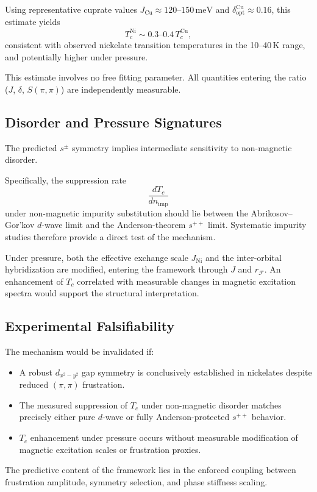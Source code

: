     Using representative cuprate values
    $J_{\mathrm{Cu}}\approx120\text{--}150\,\mathrm{meV}$
    and $\delta_{\mathrm{opt}}^{\mathrm{Cu}}\approx0.16$,
    this estimate yields
    \begin{equation}
      T_c^{\mathrm{Ni}}
      \sim
      0.3\text{--}0.4 \,
      T_c^{\mathrm{Cu}},
    \end{equation}
    consistent with observed nickelate
    transition temperatures in the 10--40\,K range,
    and potentially higher under pressure.

    This estimate involves no free fitting parameter.
    All quantities entering the ratio
    ($J$, $\delta$, $S(\pi,\pi)$)
    are independently measurable.

  \subsection{Disorder and Pressure Signatures}
    \label{subsec:nickelates-signatures}

    The predicted $s^\pm$ symmetry
    implies intermediate sensitivity
    to non-magnetic disorder.

    Specifically,
    the suppression rate
    \begin{equation}
      \frac{dT_c}{dn_{\mathrm{imp}}}
    \end{equation}
    under non-magnetic impurity substitution
    should lie between
    the Abrikosov--Gor'kov $d$-wave limit
    and the Anderson-theorem $s^{++}$ limit.
    Systematic impurity studies therefore
    provide a direct test of the mechanism.

    Under pressure,
    both the effective exchange scale $J_{\mathrm{Ni}}$
    and the inter-orbital hybridization
    are modified,
    entering the framework
    through $J$ and $r_{\mathcal F}$.
    An enhancement of $T_c$
    correlated with measurable changes
    in magnetic excitation spectra
    would support the structural interpretation.

  \subsection{Experimental Falsifiability}
    \label{subsec:nickelates-falsifiability}

    The mechanism would be invalidated if:

    \begin{itemize}
      \item
      A robust $d_{x^2-y^2}$ gap symmetry
      is conclusively established in nickelates
      despite reduced $(\pi,\pi)$ frustration.

      \item
      The measured suppression of $T_c$
      under non-magnetic disorder
      matches precisely either
      pure $d$-wave
      or fully Anderson-protected $s^{++}$ behavior.

      \item
      $T_c$ enhancement under pressure
      occurs without measurable modification
      of magnetic excitation scales
      or frustration proxies.
    \end{itemize}

    The predictive content of the framework
    lies in the enforced coupling
    between frustration amplitude,
    symmetry selection,
    and phase stiffness scaling.
